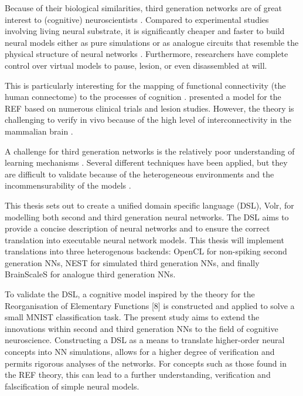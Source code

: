Because of their biological similarities, third generation 
networks are of great interest to (cognitive) neuroscientists
\autocite{Dayan2001,Bruderle2011,Eliasmith2015}.
Compared to experimental studies involving living neural substrate,
it is significantly cheaper and faster to build neural 
models either as pure simulations
\autocite{Davison2009, Eliasmith2015} or as analogue circuits
that resemble the physical structure of neural networks
\autocite{Walter2015, Schmitt2017}.
Furthermore, researchers have complete control over virtual models
to pause, lesion, or even disassembled at will.

This is particularly interesting for the
mapping of functional connectivity (the human connectome) to the
processes of cognition \autocite{Eliasmith2015, Mogensen2011}. 
\textcite{Mogensen2011} presented a model for the 
\gls{REF} based on numerous clinical trials and lesion studies.
However, the theory is challenging to verify in vivo because of
the high level of interconnectivity in the mammalian brain
\autocite{Hohwy2009, Mogensen2017}.

A challenge for third generation networks is the relatively
poor understanding of learning mechanisms \autocite{Tavanei2015,
Walter2015}.
Several different techniques have been applied, but they are
difficult to validate because of the heterogeneous environments and
the incommensurability of the models \autocite{Bohte2002, Bruderle2011}.

This thesis sets out to create a unified domain specific language (DSL), Volr, 
for modelling both second and third generation neural networks.
The DSL aims to provide a concise description of neural networks and to 
ensure the correct translation into executable neural network models.
This thesis will implement translations into three heterogenous backends: 
\gls{OpenCL} for non-spiking second generation \gls{NN}s, NEST for simulated third
generation \gls{NN}s, and finally
BrainScaleS for analogue third generation \gls{NN}s.


To validate the DSL, a cognitive model inspired by the theory for the Reorganisation
of Elementary Functions [8] is constructed and applied to solve a small MNIST classification task.
The present study aims to extend the innovations within
second and third generation \gls{NN}s to the field of
cognitive  neuroscience. 
Constructing a \gls{DSL} as a means to translate higher-order
neural concepts into \gls{NN} simulations, allows for a higher
degree of verification and permits rigorous analyses of the networks.
For concepts such as those found in the \gls{REF} theory, 
this can lead to a further understanding, verification and falscification
of simple neural models.


